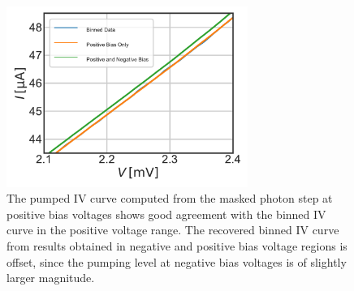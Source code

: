 \documentclass[]{article}
\begin{document}
\begin{figure}
	\centering
	\includegraphics[width=0.7\textwidth]{../Mixer_Unit_Test/2020_01_14_GausMask/Comparison_Masking_Strategy_Voltage_Embedding_Impedance.pdf}
	\caption{The pumped IV curve computed from the masked photon step at positive bias voltages shows good agreement with the binned IV curve in the positive voltage range. The recovered binned IV curve from results obtained in negative and positive bias voltage regions is offset, since the pumping level at negative bias voltages is of slightly larger magnitude. }
	\label{fig:Comparison_Masking_Strategy_Embedding_Impedance}
\end{figure}
\end{document}
